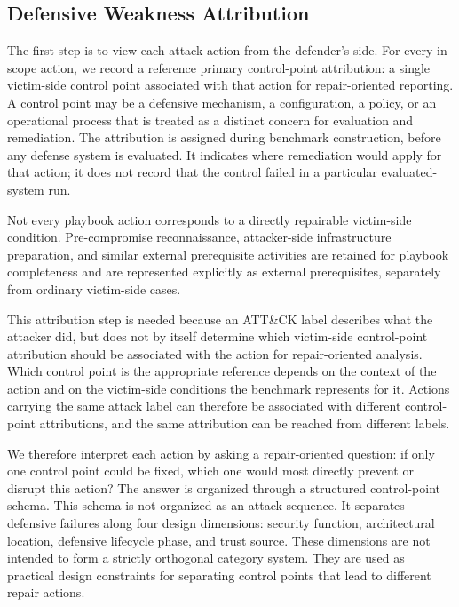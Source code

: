 \subsection{Defensive Weakness Attribution}
\label{subsec:defensive-weakness-attribution}

The first step is to view each attack action from the defender's side. For every in-scope action, we record a reference primary control-point attribution: a single victim-side control point associated with that action for repair-oriented reporting. A control point may be a defensive mechanism, a configuration, a policy, or an operational process that is treated as a distinct concern for evaluation and remediation. The attribution is assigned during benchmark construction, before any defense system is evaluated. It indicates where remediation would apply for that action; it does not record that the control failed in a particular evaluated-system run.

Not every playbook action corresponds to a directly repairable victim-side condition. Pre-compromise reconnaissance, attacker-side infrastructure preparation, and similar external prerequisite activities are retained for playbook completeness and are represented explicitly as external prerequisites, separately from ordinary victim-side cases.

This attribution step is needed because an ATT\&CK label describes what the attacker did, but does not by itself determine which victim-side control-point attribution should be associated with the action for repair-oriented analysis. Which control point is the appropriate reference depends on the context of the action and on the victim-side conditions the benchmark represents for it. Actions carrying the same attack label can therefore be associated with different control-point attributions, and the same attribution can be reached from different labels.

We therefore interpret each action by asking a repair-oriented question: if only one control point could be fixed, which one would most directly prevent or disrupt this action? The answer is organized through a structured control-point schema. This schema is not organized as an attack sequence. It separates defensive failures along four design dimensions: security function, architectural location, defensive lifecycle phase, and trust source. These dimensions are not intended to form a strictly orthogonal category system. They are used as practical design constraints for separating control points that lead to different repair actions.

